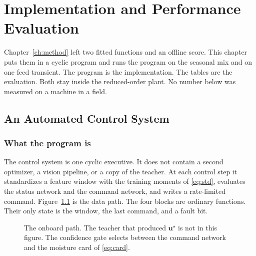 \chapter{Implementation and Performance Evaluation}
\label{ch:est}

Chapter~\ref{ch:method} left two fitted functions and an offline score. This chapter puts them in a cyclic program and runs the program on the seasonal mix and on one feed transient. The program is the implementation. The tables are the evaluation. Both stay inside the reduced-order plant. No number below was measured on a machine in a field.

\section{An Automated Control System}
\label{sec:sys}

\subsection{What the program is}

The control system is one cyclic executive. It does not contain a second optimizer, a vision pipeline, or a copy of the teacher. At each control step it standardizes a feature window with the training moments of \eqref{eq:std}, evaluates the status network and the command network, and writes a rate-limited command. Figure~\ref{fig:exec} is the data path. The four blocks are ordinary functions. Their only state is the window, the last command, and a fault bit.

\begin{figure}[ht]
\centering
{}
\caption{The onboard path. The teacher that produced \(\mathbf{u}^\star\) is not in this figure. The confidence gate selects between the command network and the moisture card of \eqref{eq:card}.}
\label{fig:exec}
\end{figure}

